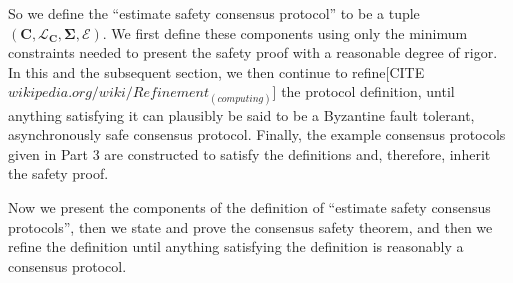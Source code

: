 \documentclass{article}
\theoremstyle{definition}
\newcommand{\cat}{
	\mathbf
}
\begin{document}
So we define the ``estimate safety consensus protocol'' to be a tuple $(\cat{C}, \mathcal{L}_\cat{C}, \cat{\Sigma}, \mathcal{E})$. We first define these components using only the minimum constraints needed to present the safety proof with a reasonable degree of rigor. In this and the subsequent section, we then continue to refine[CITE $wikipedia.org/wiki/Refinement_(computing)$] the protocol definition, until anything satisfying it can plausibly be said to be a Byzantine fault tolerant, asynchronously safe consensus protocol. Finally, the example consensus protocols given in Part 3 are constructed to satisfy the definitions and, therefore, inherit the safety proof.

Now we present the components of the definition of ``estimate safety consensus protocols'', then we state and prove the consensus safety theorem, and then we refine the definition until anything satisfying the definition is reasonably a consensus protocol.

\vspace{5mm}
\end{document}
